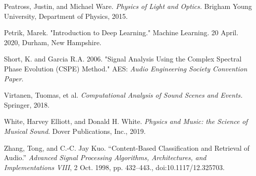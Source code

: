 \documentclass[12pt,letterpaper]{article}
\begin{document}
\begin{thebibliography}{9}
Peatross, Justin, and Michael Ware. \textit{Physics of Light and Optics.} Brigham Young University, Department of Physics, 2015.

Petrik, Marek. "Introduction to Deep Learning." Machine Learning. 20 April. 2020, Durham, New Hampshire.

Short, K. and Garcia R.A. 2006. "Signal Analysis Using the Complex Spectral Phase Evolution (CSPE) Method." AES: \textit{Audio Engineering Society Convention Paper}.

Virtanen, Tuomas, et al. \textit{Computational Analysis of Sound Scenes and Events.} Springer, 2018.

White, Harvey Elliott, and Donald H. White. \textit{Physics and Music: the Science of Musical Sound}. Dover Publications, Inc., 2019.

Zhang, Tong, and C.-C. Jay Kuo. “Content-Based Classification and Retrieval of Audio.” \textit{Advanced Signal Processing Algorithms, Architectures, and Implementations VIII}, 2 Oct. 1998, pp. 432–443., doi:10.1117/12.325703.

\end{thebibliography}

\end{document}

